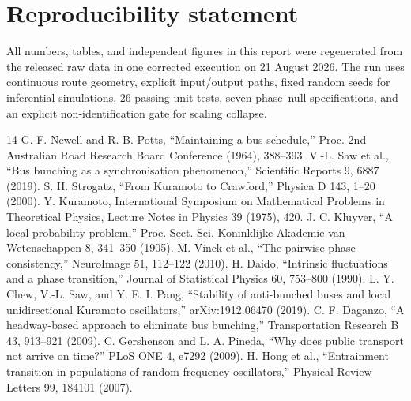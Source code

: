 \documentclass[9pt,twocolumn,twoside]{opticajnl}
\begin{document}
\section*{Reproducibility statement}

All numbers, tables, and independent figures in this report were regenerated from the released raw
data in one corrected execution on 21 August 2026.  The run uses continuous route geometry, explicit
input/output paths, fixed random seeds for inferential simulations, 26 passing unit tests, seven
phase--null specifications, and an explicit non-identification gate for scaling collapse.

\begin{thebibliography}{14}\small
{} G. F. Newell and R. B. Potts, ``Maintaining a bus schedule,'' Proc. 2nd Australian Road Research Board Conference (1964), 388--393.
 V.-L. Saw et al., ``Bus bunching as a synchronisation phenomenon,'' Scientific Reports 9, 6887 (2019).
 S. H. Strogatz, ``From Kuramoto to Crawford,'' Physica D 143, 1--20 (2000).
 Y. Kuramoto, International Symposium on Mathematical Problems in Theoretical Physics, Lecture Notes in Physics 39 (1975), 420.
 J. C. Kluyver, ``A local probability problem,'' Proc. Sect. Sci. Koninklijke Akademie van Wetenschappen 8, 341--350 (1905).
 M. Vinck et al., ``The pairwise phase consistency,'' NeuroImage 51, 112--122 (2010).
 H. Daido, ``Intrinsic fluctuations and a phase transition,'' Journal of Statistical Physics 60, 753--800 (1990).
 L. Y. Chew, V.-L. Saw, and Y. E. I. Pang, ``Stability of anti-bunched buses and local unidirectional Kuramoto oscillators,'' arXiv:1912.06470 (2019).
 C. F. Daganzo, ``A headway-based approach to eliminate bus bunching,'' Transportation Research B 43, 913--921 (2009).
 C. Gershenson and L. A. Pineda, ``Why does public transport not arrive on time?'' PLoS ONE 4, e7292 (2009).
 H. Hong et al., ``Entrainment transition in populations of random frequency oscillators,'' Physical Review Letters 99, 184101 (2007).
\end{thebibliography}
\end{document}
